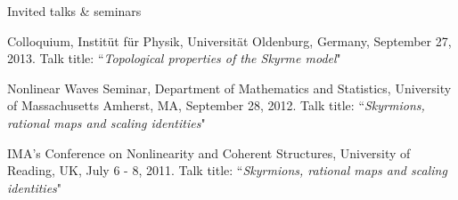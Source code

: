 \documentclass[10pt]{article} %
\begin{document}
\begin{section}{Invited talks \& seminars}
\begin{etaremune}
\item   Colloquium, Instit\"ut f\"ur Physik, Universit\"at Oldenburg, Germany, September 27, 2013. Talk title: 
        ``\textit{Topological properties of the Skyrme model}"
  
\item   Nonlinear Waves Seminar, Department of Mathematics and Statistics, University of Massachusetts Amherst, MA, September 28, 2012.
        Talk title: ``\textit{Skyrmions, rational maps and scaling identities}"
   
\item   IMA's Conference on Nonlinearity and Coherent Structures, University of Reading, UK, July 6 - 8, 2011.
        Talk title: ``\textit{Skyrmions, rational maps and scaling identities}"

\end{etaremune}
\end{section}
\end{document}
